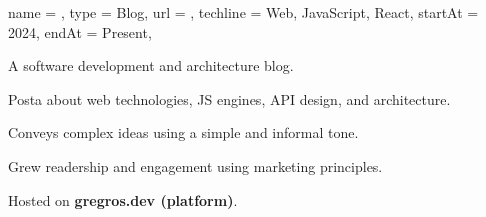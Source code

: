 \begin{projectx}{%
    name = \gregrosdev,
    type = {Blog},
    url = {\mywebsite},
    techline = {Web, JavaScript, React},
    startAt = 2024,
    endAt = Present,
  }
  \vspace{-7pt}

\item A software development and architecture blog.
\item Posta about web technologies, JS engines, API design, and architecture.
\item Conveys complex ideas using a simple and informal tone.
\item Grew readership and engagement using marketing principles.
\item Hosted on \textbf{gregros.dev (platform)}.
\end{projectx}
